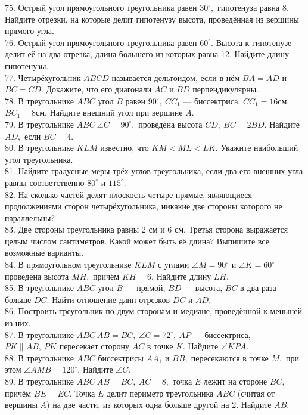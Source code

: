 \documentclass[12pt]{article}
\begin{document}
75. Острый угол прямоугольного треугольника равен $30^\circ,$ гипотенуза равна 8. Найдите отрезки, на которые делит гипотенузу высота, проведённая из вершины прямого угла.\\
76. Острый угол прямоугольного треугольника равен $60^\circ.$ Высота к гипотенузе делит её на два отрезка, длина большего из которых равна 12. Найдите длину гипотенузы.\\
77. Четырёхугольник $ABCD$ называется дельтоидом, если в нём $BA=AD$ и $BC=CD.$ Докажите, что его диагонали $AC$ и $BD$ перпендикулярны.\\
78. В треугольнике $ABC$ угол $B$ равен $90^\circ,\ CC_1$ --- биссектриса, $CC_1=16$см, $BC_1=8$см. Найдите внешний угол при вершине $A.$\\
79. В треугольнике $ABC\ \angle C=90^\circ,$ проведена высота $CD,\ BC=2BD.$ Найдите $AD,$ если $BC=4.$\\
80. В треугольнике $KLM$ известно, что $KM<ML<LK.$ Укажите наибольший угол треугольника.\\
81. Найдите градусные меры трёх углов треугольника, если два его внешних угла равны соответственно $80^\circ$ и $115^\circ.$\\
82. На сколько частей делят плоскость четыре прямые, являющиеся продолжениями сторон четырёхугольника, никакие две стороны которого не параллельны?\\
83. Две стороны треугольника равны 2 см и 6 см. Третья сторона выражается целым числом сантиметров. Какой может быть её длина? Выпишите все возможные варианты.\\
84. В прямоугольном треугольнике $KLM$ с углами $\angle M=90^\circ$ и $\angle K=60^\circ$ проведена высота $MH,$ причём $KH=6.$ Найдите длину $LH.$\\
85. В треугольнике $ABC$ угол $B$ --- прямой, $BD$ --- высота,  $BC$ в два раза больше $DC.$ Найти отношение длин отрезков $DC$ и $AD.$\\
86. Построить треугольник по двум сторонам и медиане, проведённой к меньшей из них.\\
87. В треугольнике $ABC\ AB=BC,\ \angle C=72^\circ,\ AP$ --- биссектриса, $PK\parallel AB,\ PK$ пересекает сторону $AC$ в точке $K.$ Найдите $\angle KPA.$\\
88. В треугольнике $ABC$ биссектрисы $AA_1$ и $BB_1$ пересекаются в точке $M,$ при этом $\angle AMB=120^\circ.$ Найдите $\angle C.$\\
89. В треугольнике $ABC\ AB=BC,\ AC=8,$ точка $E$ лежит на стороне $BC,$ причём $BE=EC.$ Точка $E$ делит периметр треугольника $ABC$ (считая от вершины $A$) на две части, из которых одна больше другой на 2. Найдите $AB.$\\
\end{document}
